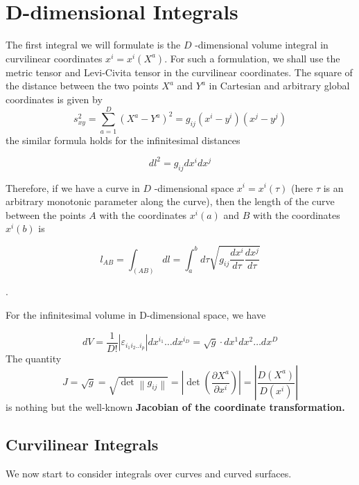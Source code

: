 \section{D-dimensional Integrals}
The first integral we will formulate is the $D$ -dimensional volume integral in curvilinear coordinates $x^{i}=x^{i}\left(X^{a}\right) .$ For such a formulation, we shall use the metric tensor and Levi-Civita tensor in the curvilinear coordinates. The square of the distance between the two points $X^{a}$ and $Y^{a}$ in Cartesian and arbitrary global coordinates is given by
$$
s_{x y}^{2}=\sum_{a=1}^{D}\left(X^{a}-Y^{a}\right)^{2}=g_{i j}\left(x^{i}-y^{i}\right)\left(x^{j}-y^{j}\right)
$$
the similar formula holds for the infinitesimal distances
\begin{qt}
\begin{equation}
d l^{2}=g_{i j} d x^{i} d x^{j}
\end{equation}
\end{qt}
Therefore, if we have a curve in $D$ -dimensional space $x^{i}=x^{i}(\tau)$ (here $\tau$ is an arbitrary monotonic parameter along the curve), then the length of the curve between the points $A$ with the coordinates $x^{i}(a)$ and $B$ with the coordinates $x^{i}(b)$ is
\begin{qt}
\begin{equation}
l_{A B}=\int_{(A B)} d l=\int_{a}^{b} d \tau \sqrt{g_{i j} \frac{d x^{i}}{d \tau} \frac{d x^{j}}{d \tau}}
\end{equation}
\end{qt}
.

For the infinitesimal volume in D-dimensional space, we have
\begin{qt}
\begin{equation}
d V=\frac{1}{D !}\left|\varepsilon_{i_{1} i_{2} . . i_{p}}\right| d x^{i_{1}} \ldots d x^{i_{D}}=\sqrt{g} \cdot d x^{1} d x^{2} \ldots d x^{D}
\end{equation}
The quantity
\begin{equation}
J=\sqrt{g}=\sqrt{\operatorname{det}\left\|g_{i j}\right\|}=\left|\operatorname{det}\left(\frac{\partial X^{a}}{\partial x^{i}}\right)\right|=\left|\frac{D\left(X^{a}\right)}{D\left(x^{i}\right)}\right|
\end{equation}
is nothing but the well-known \textbf{Jacobian of the coordinate transformation.}
\end{qt}

\subsection{Curvilinear Integrals}
We now start to consider integrals over curves and curved surfaces.